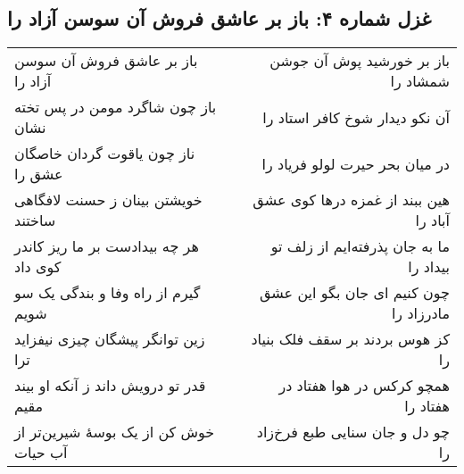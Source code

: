 \begin{center}
\section*{غزل شماره ۴: باز بر عاشق فروش آن سوسن آزاد را}
\label{sec:004}
\begin{longtable}{l p{0.5cm} r}
باز بر عاشق فروش آن سوسن آزاد را
&&
باز بر خورشید پوش آن جوشن شمشاد را
\\
باز چون شاگرد مومن در پس تخته نشان
&&
آن نکو دیدار شوخ کافر استاد را
\\
ناز چون یاقوت گردان خاصگان عشق را
&&
در میان بحر حیرت لولو فریاد را
\\
خویشتن بینان ز حسنت لافگاهی ساختند
&&
هین ببند از غمزه درها کوی عشق آباد را
\\
هر چه بیدادست بر ما ریز کاندر کوی داد
&&
ما به جان پذرفته‌ایم از زلف تو بیداد را
\\
گیرم از راه وفا و بندگی یک سو شویم
&&
چون کنیم ای جان بگو این عشق مادرزاد را
\\
زین توانگر پیشگان چیزی نیفزاید ترا
&&
کز هوس بردند بر سقف فلک بنیاد را
\\
قدر تو درویش داند ز آنکه او بیند مقیم
&&
همچو کرکس در هوا هفتاد در هفتاد را
\\
خوش کن از یک بوسهٔ شیرین‌تر از آب حیات
&&
چو دل و جان سنایی طبع فرخ‌زاد را
\\
\end{longtable}
\end{center}

